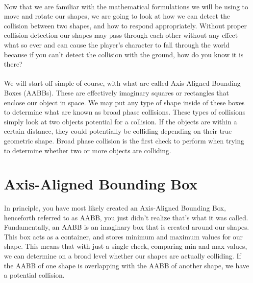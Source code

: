 \documentclass[12pt, letterpaper]{report}
\begin{document}
\paragraph{} Now that we are familiar with the mathematical formulations we will be using to move and rotate our shapes, we are going to look at how we can detect the collision between two shapes, and how to respond appropriately. Without proper collision detection our shapes may pass through each other without any effect what so ever and can cause the player's character to fall through the world because if you can't detect the collision with the ground, how do you know it is there?
\paragraph{} We will start off simple of course, with what are called Axis-Aligned Bounding Boxes (AABBs). These are effectively imaginary squares or rectangles that enclose our object in space. We may put any type of shape inside of these boxes to determine what are known as broad phase collisions. These types of collisions simply look at two objects potential for a collision. If the objects are within a certain distance, they could potentially be colliding depending on their true geometric shape. Broad phase collision is the first check to perform when trying to determine whether two or more objects are colliding. 
	\section{Axis-Aligned Bounding Box}
	\paragraph{} In principle, you have most likely created an Axis-Aligned Bounding Box, henceforth referred to as AABB, you just didn't realize that's what it was called. Fundamentally, an AABB is an imaginary box that is created around our shapes. This box acts as a container, and stores minimum and maximum values for our shape. This means that with just a single check, comparing min and max values, we can determine on a broad level whether our shapes are actually colliding. If the AABB of one shape is overlapping with the AABB of another shape, we have a potential collision. 
\end{document}
